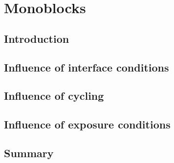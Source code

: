 \chapter{Monoblocks}
\section{Introduction}
\section{Influence of interface conditions}

\section{Influence of cycling}
\section{Influence of exposure conditions}

\section{Summary}